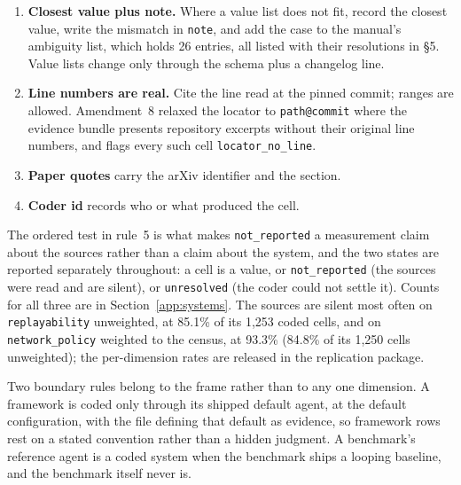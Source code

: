 \begin{enumerate}
\begin{enumerate}
    repository, or a paper only) $\rightarrow$ \texttt{not\_reported: true}, \texttt{value: null},
    and \texttt{note} names the place that was missing.
  \end{enumerate}
  The absence of a \emph{mention} is never evidence of absence: prose that does not discuss rollback
  is not evidence that rollback is absent. Equally, \texttt{not\_reported} is never correct once the
  place where the feature would be declared has been opened. This is the form rule~5 took under
  protocol amendment~9; the earlier form and the measured effect of the rewrite are reported in
  \S4.
\item \textbf{Closest value plus note.} Where a value list does not fit, record the closest value,
  write the mismatch in \texttt{note}, and add the case to the manual's ambiguity list, which holds
  26 entries, all listed with their resolutions in \S5. Value lists change only through the schema plus a
  changelog line.
\item \textbf{Line numbers are real.} Cite the line read at the pinned commit; ranges are allowed.
  Amendment~8 relaxed the locator to \texttt{path@commit} where the evidence bundle presents
  repository excerpts without their original line numbers, and flags every such cell
  \texttt{locator\_no\_line}.
\item \textbf{Paper quotes} carry the arXiv identifier and the section.
\item \textbf{Coder id} records who or what produced the cell.
\end{enumerate}

The ordered test in rule~5 is what makes \texttt{not\_reported} a measurement claim about the
sources rather than a claim about the system, and the two states are reported separately throughout:
a cell is a value, or \texttt{not\_reported} (the sources were read and are silent), or
\texttt{unresolved} (the coder could not settle it). Counts for all three are in
Section~\ref{app:systems}. The sources are silent most often on \texttt{replayability} unweighted, at
85.1\% of its 1,253 coded cells, and on \texttt{network\_policy} weighted to the census, at 93.3\%
(84.8\% of its 1,250 cells unweighted); the per-dimension rates are released in the replication
package.

Two boundary rules belong to the frame rather than to any one dimension. A framework is coded only
through its shipped default agent, at the default configuration, with the file defining that default as
evidence, so framework rows rest on a stated convention rather than a hidden judgment. A benchmark's
reference agent is a coded system when the benchmark ships a looping baseline, and the benchmark itself
never is.

